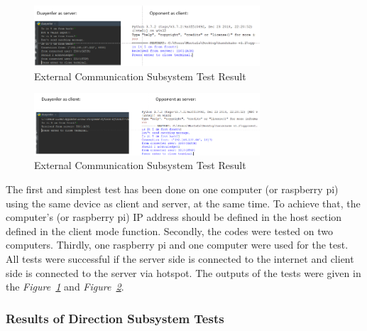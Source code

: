 \documentclass[a4paper,12pt]{article}
\begin{document}
\begin{figure}[h]

\includegraphics[width=0.75\textwidth,center]{images/hsake1}

\caption{External Communication Subsystem Test Result \label{fig:hsake_test1} }

\end{figure}



\begin{figure}[h]

\includegraphics[width=0.75\textwidth,center]{images/hsake2}

\caption{External Communication Subsystem Test Result \label{fig:hsake_test2} }

\end{figure}





The first and simplest test has been done on one computer (or raspberry pi) using the same device as client and server, at the same time. To achieve that, the computer's (or raspberry pi) IP address should be defined in the host section defined in the client mode function. Secondly, the codes were tested on two computers. Thirdly, one raspberry pi and one computer were used for the test. All tests were successful if the server side is connected to the internet and client side is connected to the server via hotspot. The outputs of the tests were given in the \textit{Figure~\ref{fig:hsake_test1}} and \textit{Figure~\ref{fig:hsake_test2}}.














\subsubsection*{Results of Direction Subsystem Tests}
\end{document}
